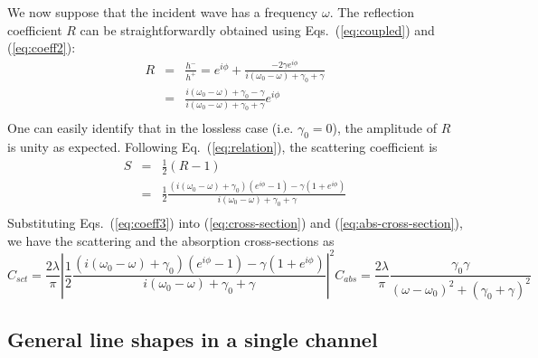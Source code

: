 \documentclass[preprint,aps]{revtex4}
\begin{document}
We now suppose that the incident wave has a frequency $\omega$. The
reflection coefficient $R$ can be straightforwardly obtained using
Eqs.~(\ref{eq:coupled}) and (\ref{eq:coeff2}):
\begin{equation}
\label{eq:reflection-coef}
\begin{array}{*{20}{l}}
 R & = & \frac{{h^ - }}{{h^ + }} = {e^{i\phi }} + \frac{{ - 2\gamma {e^{i\phi }}}}{{i({\omega _0} - \omega ) + \gamma_0 + \gamma }} \\
{}  & = & \frac{i({\omega _0} - \omega )+ \gamma_0  - \gamma }{{i({\omega _0} - \omega ) + \gamma_0 + \gamma }} {e^{i\phi }}\\
 \end{array}
\end{equation}
One can easily identify that in the lossless case (i.e.
$\gamma_0=0$), the amplitude of $R$ is unity  as expected. Following
Eq.~(\ref{eq:relation}), the scattering coefficient is
\begin{equation}
\label{eq:coeff3}
\begin{array}{*{20}{l}}
 {S} & = & \frac{1}{2}({R} - 1) \\
{}  & = & \frac{1}{2}\frac{{(i({\omega _0} - \omega )+ \gamma_0)({e^{i\phi }} - 1) - \gamma (1 + {e^{i\phi }})}}{{i({\omega _0} - \omega ) + \gamma_0 + \gamma }} \\
 \end{array}
\end{equation} Substituting
Eqs.~(\ref{eq:coeff3}) into (\ref{eq:cross-section}) and
(\ref{eq:abs-cross-section}), we have the scattering and the
absorption cross-sections as
\begin{subequations}
\label{eq:coss-section-form}
\begin{equation}
\label{eq:coeff6} {C_{sct}} = \frac{{2\lambda }}{\pi }{\left|
{\frac{1}{2}\frac{{(i({\omega _0} - \omega ) + {\gamma
_0})({e^{i\phi }} - 1) - \gamma (1 + {e^{i\phi }})}}{{i({\omega _0}
- \omega ) + {\gamma _0} + \gamma }}} \right|^2}
\end{equation}
\begin{equation}
\label{abs-coss-section-form} {C_{abs}} = \frac{{2\lambda }}{\pi
}\frac{{{\gamma _0}\gamma }}{{{{(\omega  - {\omega _0})}^2} +
{{({\gamma _0} + \gamma )}^2}}}
\end{equation}
\end{subequations}




\subsection{General line shapes in a single channel}
\end{document}
